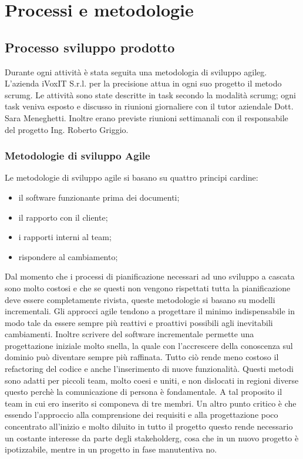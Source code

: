 
\chapter{Processi e metodologie}
\label{cap:processi-metodologie}


\section{Processo sviluppo prodotto}
Durante ogni attività è stata seguita una metodologia di sviluppo \gls{agileg}. L'azienda iVoxIT S.r.l. per la precisione attua in ogni suo progetto il metodo \gls{scrumg}. Le attività sono state descritte in task secondo la modalità \gls{scrumg}; ogni task veniva esposto e discusso in riunioni giornaliere con il tutor aziendale Dott. Sara Meneghetti. Inoltre erano previste riunioni settimanali con il responsabile del progetto Ing. Roberto Griggio.

\subsection{Metodologie di sviluppo Agile}
Le metodologie di sviluppo agile si basano su quattro principi cardine:
\begin{itemize}
    \item il software funzionante prima dei documenti;
    \item il rapporto con il cliente;
    \item i rapporti interni al team;
    \item rispondere al cambiamento;
\end{itemize}

Dal momento che i processi di pianificazione necessari ad uno sviluppo a cascata sono molto costosi e che se questi non vengono rispettati tutta la pianificazione deve essere completamente rivista, queste metodologie si basano su modelli incrementali. Gli approcci agile tendono a progettare il minimo indispensabile in modo tale da essere sempre più reattivi e proattivi possibili agli inevitabili cambiamenti. Inoltre scrivere del software incrementale permette una progettazione iniziale molto snella, la quale con l’accrescere della conoscenza sul dominio può diventare sempre più raffinata. Tutto ciò rende meno costoso il refactoring del codice e anche l’inserimento di nuove funzionalità. 
Questi metodi sono adatti per piccoli team, molto coesi e uniti, e non dislocati in regioni diverse questo perchè la comunicazione di persona è fondamentale. A tal proposito il team in cui ero inserito si componeva di tre membri.
Un altro punto critico è che essendo l’approccio alla comprensione dei requisiti e alla progettazione poco concentrato all’inizio e molto diluito in tutto il progetto questo rende necessario un costante interesse da parte degli \gls{stakeholderg}, cosa che in un nuovo progetto è ipotizzabile, mentre in un progetto in fase manutentiva no.
